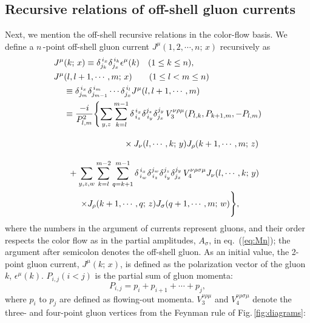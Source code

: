\subsection{Recursive relations of off-shell gluon currents}
\label{recursive}
Next, we mention the off-shell recursive relations in the color-flow
basis. We define a $n$\,-point off-shell gluon current $J^{\mu}(1, 2,\cdots,n;\,x)$ recursively
as
\begin{align}
J^{\mu}&(k;\,x)\equiv\delta_{j_k}^{\,i_x}\delta_{j_x}^{\,i_k}\epsilon^{\mu}(k)\hspace{1em}(1\leq
 k\leq n),\label{j2}\\
J^{\mu}&(l, l+1,\cdots,m;\,x) \hspace{2em}(1\leq l < m\leq n)\nonumber\\
&\equiv\delta^{\,i_x}_{j_m}\delta^{\,i_m}_{j_{m-1}}\cdots\delta^{\,i_{l}}_{j_x}J^{\mu}(l, l+1,\cdots,m) \nonumber\\
&\equiv\frac{-i}{P^2_{l, m}}\Biggl\{\sum_{y, z}\sum_{k=l}^{m-1}
\delta_{\,i_z}^{\,i_x}\delta_{\,i_y}^{j_z}\delta_{j_x}^{j_y}\,V^{\nu\rho\mu}_3(P_{l, k},P_{k+1, m},-P_{l, m})\nonumber\\
 &\hspace{7em}\times J_{\nu}
(l,\cdots,k;\,y)J_{\rho}(k+1,\cdots,m;\,z)\Biggr.\nonumber\\
&\hspace{0.5em}+\sum_{y, z, w}\sum_{k=l}^{m-2}\sum_{q=k+1}^{m-1}
\delta_{\,i_w}^{\,i_x}\delta_{\,i_z}^{j_w}\delta_{\,i_y}^{j_z}\delta_{j_x}^{j_y}
 \,V^{\nu\rho\sigma\mu}_4J_{\nu}(l, \cdots,k;\,y)\nonumber\\
 &\hspace{2em}\Biggl.\times J_{\rho}(k+1,\cdots,q;\,z)J_{\sigma}(q+1,\cdots,m;\,w)\Biggr\},
\label{eq:off-shell}
\end{align}
where the numbers in the argument of currents represent gluons,
 and their order respects the color flow as in the partial amplitudes,
 $A_{\sigma}$, in eq.~(\ref{eq:Mn}); the argument after semicolon denotes the off-shell gluon. As an initial value, the 2-point gluon current,
 $J^{\mu}(k;\,x)$, is defined as the polarization vector of the gluon $k$,
 $\epsilon^{\mu}(k)$. $P_{i,j} (i<j)$ is the partial sum
 of gluon momenta:
 \begin{equation}
P_{i,j}=p_i+p_{i+1}+\cdots+p_j,
 \end{equation}
where $p_i$ to $p_j$ are defined as
 flowing-out momenta.
$V_3^{\nu\rho\mu}$ and $V_4^{\nu\rho\sigma\mu}$ denote the three- and
 four-point gluon vertices from the Feynman rule of Fig.\,\ref{fig:diagrams}:

